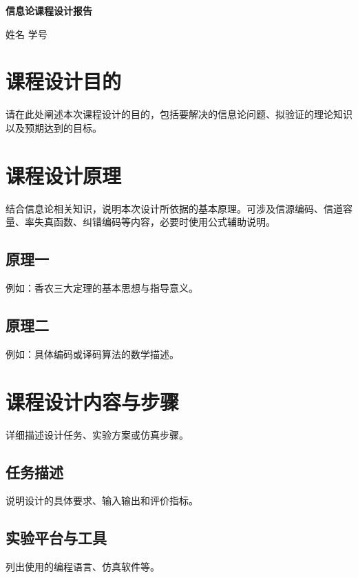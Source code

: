 \documentclass[12pt,a4paper]{ctexart}
\begin{document}
	
	\begin{center}
		{\bfseries 信息论课程设计报告\par}
		\vspace{0.8em}
		{ 姓名 \quad 学号\par}
		\vspace{1.2em}
	\end{center}
	
	
	\section{课程设计目的}
	
	请在此处阐述本次课程设计的目的，包括要解决的信息论问题、拟验证的理论知识以及预期达到的目标。
	
	\section{课程设计原理}
	
	结合信息论相关知识，说明本次设计所依据的基本原理。可涉及信源编码、信道容量、率失真函数、纠错编码等内容，必要时使用公式辅助说明。
	
	\subsection{原理一}
	例如：香农三大定理的基本思想与指导意义。
	
	\subsection{原理二}
	例如：具体编码或译码算法的数学描述。
	
	\section{课程设计内容与步骤}
	
	详细描述设计任务、实验方案或仿真步骤。
	
	\subsection{任务描述}
	说明设计的具体要求、输入输出和评价指标。
	
	\subsection{实验平台与工具}
	列出使用的编程语言、仿真软件等。
	
\end{document}

